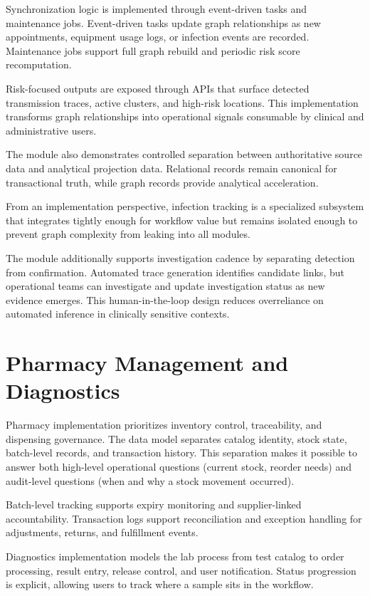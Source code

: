 Synchronization logic is implemented through event-driven tasks and maintenance jobs. Event-driven tasks update graph relationships as new appointments, equipment usage logs, or infection events are recorded. Maintenance jobs support full graph rebuild and periodic risk score recomputation.

Risk-focused outputs are exposed through APIs that surface detected transmission traces, active clusters, and high-risk locations. This implementation transforms graph relationships into operational signals consumable by clinical and administrative users.

The module also demonstrates controlled separation between authoritative source data and analytical projection data. Relational records remain canonical for transactional truth, while graph records provide analytical acceleration.

From an implementation perspective, infection tracking is a specialized subsystem that integrates tightly enough for workflow value but remains isolated enough to prevent graph complexity from leaking into all modules.

The module additionally supports investigation cadence by separating detection from confirmation. Automated trace generation identifies candidate links, but operational teams can investigate and update investigation status as new evidence emerges. This human-in-the-loop design reduces overreliance on automated inference in clinically sensitive contexts.

\section{Pharmacy Management and Diagnostics}\label{510-pharmacy-management-and-diagnostics}

Pharmacy implementation prioritizes inventory control, traceability, and dispensing governance. The data model separates catalog identity, stock state, batch-level records, and transaction history. This separation makes it possible to answer both high-level operational questions (current stock, reorder needs) and audit-level questions (when and why a stock movement occurred).

Batch-level tracking supports expiry monitoring and supplier-linked accountability. Transaction logs support reconciliation and exception handling for adjustments, returns, and fulfillment events.

Diagnostics implementation models the lab process from test catalog to order processing, result entry, release control, and user notification. Status progression is explicit, allowing users to track where a sample sits in the workflow.


